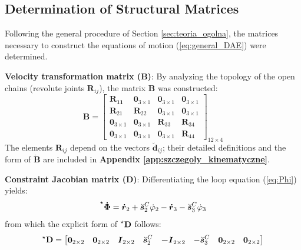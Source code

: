 \subsection{Determination of Structural Matrices}
Following the general procedure of Section \ref{sec:teoria_ogolna}, the matrices necessary to construct the equations of motion (\ref{eq:general_DAE}) were determined.

\textbf{Velocity transformation matrix ($\mathbf{B}$)}:
By analyzing the topology of the open chains (revolute joints $\boldsymbol{R}_{ij}$), the matrix $\mathbf{B}$ was constructed:
\begin{equation}
    \label{eq:B_matrix}
    \mathbf{B} = \begin{bmatrix}
        \boldsymbol{R_{11}} & \boldsymbol{0}_{3\times1} &\boldsymbol{0}_{3\times1} &\boldsymbol{0}_{3\times1}\\
        \boldsymbol{R}_{21} & \boldsymbol{R}_{22} & \boldsymbol{0}_{3\times1} & \boldsymbol{0}_{3\times1}\\ 
        \boldsymbol{0}_{3\times1} & \boldsymbol{0}_{3\times1}&\boldsymbol{R}_{33}&\boldsymbol{R}_{34}\\
        \boldsymbol{0}_{3\times1} & \boldsymbol{0}_{3\times1} & \boldsymbol{0}_{3\times1} & \boldsymbol{R}_{44}
     \end{bmatrix}_{12\times4}
\end{equation}
The elements $\boldsymbol{R}_{ij}$ depend on the vectors $\boldsymbol{\breve d}_{ij}$; their detailed definitions and the form of $\mathbf{\dot B}$ are included in \textbf{Appendix \ref{app:szczegoly_kinematyczne}}.

\textbf{Constraint Jacobian matrix ($\mathbf{D}$)}:
Differentiating the loop equation (\ref{eq:Phi}) yields:
\begin{equation}
    \label{eq:vector_loop_differentiated}
    \prescript{\star}{}{\boldsymbol{\dot \Phi}} = \boldsymbol{\dot r}_2 + \boldsymbol{\breve s}_2^C\dot \varphi_2-\boldsymbol{\dot r}_3- \boldsymbol{\breve s}_3^C\dot \varphi_3
\end{equation}
from which the explicit form of $\prescript{\star}{}{\mathbf{D}}$ follows:
\begin{equation}
    \label{eq:absolute_jacobain}
        \prescript{\star}{}{\mathbf{D}}
        = 
        \begin{bmatrix}
        \boldsymbol{0}_{2\times2} &  \boldsymbol{0}_{2\times2} & \boldsymbol{I}_{2\times2} &  \boldsymbol{\breve s}_2^C & \boldsymbol{-I}_{2\times2} & -\boldsymbol{\breve s}_3^C &  \boldsymbol{0}_{2\times2} &  \boldsymbol{0}_{2\times2}
        \end{bmatrix}
\end{equation}

